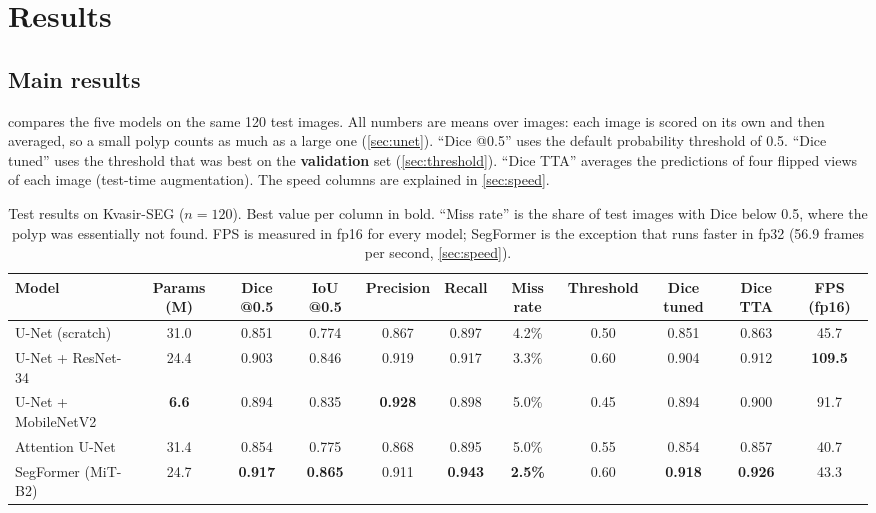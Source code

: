 \section{Results}
\label{sec:results}

\subsection{Main results}
\label{sec:main-results}
 compares the five models on the same 120 test images. All numbers are means over images: each
image is scored on its own and then averaged, so a small polyp counts as much as a large one (\cref{sec:unet}).
``Dice @0.5'' uses the default probability threshold of 0.5. ``Dice tuned'' uses the threshold that was best on
the \textbf{validation} set (\cref{sec:threshold}). ``Dice TTA'' averages the predictions of four flipped views of each image
(test-time augmentation). The speed columns are explained in \cref{sec:speed}.

\begin{table}[t]
  \centering
  \small
  \setlength{\tabcolsep}{5pt}
  \begin{adjustbox}{max width=\textwidth}
  \begin{tabular}{@{}lcccccccccc@{}}
    \toprule
    Model & Params (M) & Dice @0.5 & IoU @0.5 & Precision & Recall & Miss rate & Threshold & Dice tuned & Dice TTA & FPS (fp16) \\
    \midrule
    U-Net (scratch)     & 31.0         & 0.851          & 0.774          & 0.867          & 0.897          & 4.2\%          & 0.50 & 0.851          & 0.863          & 45.7 \\
    U-Net + ResNet-34   & 24.4         & 0.903          & 0.846          & 0.919          & 0.917          & 3.3\%          & 0.60 & 0.904          & 0.912          & \textbf{109.5} \\
    U-Net + MobileNetV2 & \textbf{6.6} & 0.894          & 0.835          & \textbf{0.928} & 0.898          & 5.0\%          & 0.45 & 0.894          & 0.900          & 91.7 \\
    Attention U-Net     & 31.4         & 0.854          & 0.775          & 0.868          & 0.895          & 5.0\%          & 0.55 & 0.854          & 0.857          & 40.7 \\
    SegFormer (MiT-B2)  & 24.7         & \textbf{0.917} & \textbf{0.865} & 0.911          & \textbf{0.943} & \textbf{2.5\%} & 0.60 & \textbf{0.918} & \textbf{0.926} & 43.3 \\
    \bottomrule
  \end{tabular}
  \end{adjustbox}
  \caption{Test results on Kvasir-SEG ($n = 120$). Best value per column in bold. ``Miss rate'' is the share of test images
  with Dice below 0.5, where the polyp was essentially not found. FPS is measured in fp16 for every model; SegFormer is
  the exception that runs faster in fp32 (56.9 frames per second, \cref{sec:speed}).}
  \label{tab:main}
\end{table}

